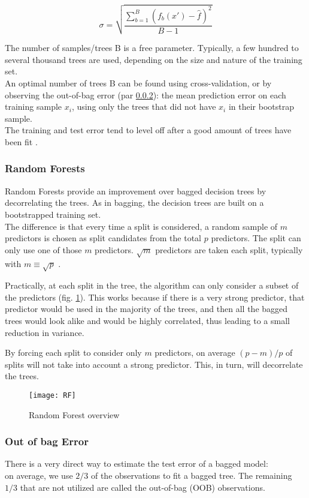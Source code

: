 \begin{equation}
	{\sigma ={\sqrt {\frac {\sum_{b=1}^{B}(f_{b}(x')-{\hat {f}})^{2}}{B-1}}}}
\end{equation}

The number of samples/trees B is a free parameter. Typically, a few hundred to several thousand trees are used, depending on the size and nature of the training set. \\
An optimal number of trees B can be found using cross-validation, or by observing the out-of-bag error (par \ref{oob}): the mean prediction error on each training sample $x_i$, using only the trees that did not have $x_i$ in their bootstrap sample. \\
The training and test error tend to level off after a good amount of trees have been fit \cite{ISLR}.

\subsubsection{Random Forests}
Random Forests provide an improvement over bagged decision trees by decorrelating the trees. As in bagging, the decision trees are built on a bootstrapped training set. \\
The difference is that every time a split is considered, a random sample of $m$ predictors is chosen as split candidates from the total $p$ predictors. The split can only use one of those $m$ predictors. $\sqrt{m}$ predictors are taken each split, typically with $m \equiv \sqrt{p}$ \cite{ISLR}.

Practically, at each split in the tree, the algorithm can only consider a subset of the predictors (fig. \ref{fig:RF}). This works because if there is a very strong predictor, that predictor would be used in the majority of the trees, and then all the bagged trees would look alike and would be highly correlated, thus leading to a small reduction in variance.

By forcing each split to consider only $m$ predictors, on average $(p - m)/p$ of splits will not take into account a strong predictor. This, in turn, will decorrelate the trees.

\begin{figure}[H]
	\centering
	\texttt{[image: RF]}
	\caption{Random Forest overview}
	\label{fig:RF}
\end{figure}

\subsubsection{Out of bag Error} \label{oob}
There is a very direct way to estimate the test error of a bagged model: \\
on average, we use $2/3$ of the observations to fit a bagged tree. The remaining $1/3$ that are not utilized are called the out-of-bag (OOB) observations. 

